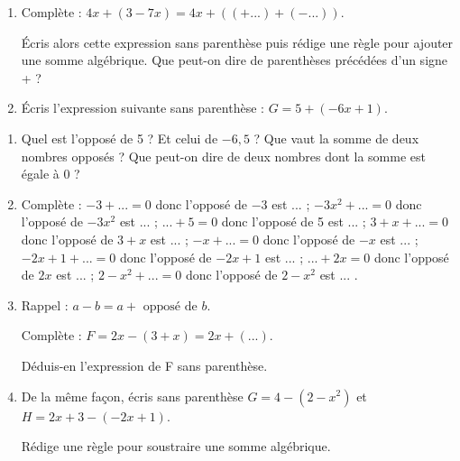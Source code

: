 \begin{activite}

\begin{partie}
\begin{enumerate}
\item Complète : $4x + (3 -7x) =  4x + \left((+ ...) + (-...)\right)$.

Écris alors cette expression sans parenthèse puis rédige une règle pour ajouter une somme algébrique. Que peut-on dire de parenthèses précédées d'un signe + ?
\item Écris l'expression suivante sans parenthèse : $G = 5 + (-6x + 1)$.
\end{enumerate}
\end{partie}

\begin{partie}
\begin{enumerate}
\item Quel est l'opposé de 5 ? Et celui de $-6,5$ ? Que vaut la somme de deux nombres opposés ? Que peut-on dire de deux nombres dont la somme est égale à 0 ?
\item Complète :
    \subitem $-3 + ... = 0$ donc l'opposé de $-3$ est ... ;
    \subitem $-3x^2 + ... = 0$ donc l'opposé de $-3x^2$ est ... ;
    \subitem $... + 5 = 0$ donc l'opposé de 5 est ... ;
    \subitem $3 + x + ... = 0$ donc l'opposé de $3 + x$ est ... ;
    \subitem $-x + ... = 0$ donc l'opposé de $-x$ est ... ;
    \subitem $-2x + 1 + ... = 0$ donc l'opposé de $-2x + 1$ est ... ;
    \subitem $... + 2x = 0$ donc l'opposé de $2x$ est ... ;
    \subitem $2 -x^2 + ... = 0$ donc l'opposé de $2 -x^2$ est ... .
\item Rappel : $a-b = a + \text{ opposé de } b$.

Complète : $F = 2x -(3 + x) = 2x + (...)$.

Déduis-en l'expression de F sans parenthèse.

\item De la même façon, écris sans parenthèse $G = 4 -(2 -x^2)$ et $H = 2x + 3 -(-2x + 1)$.

Rédige une règle pour soustraire une somme algébrique.
\end{enumerate}       
\end{partie}

\end{activite}



